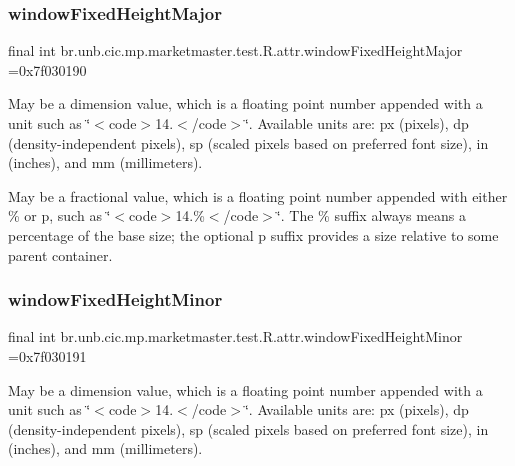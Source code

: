 \subsubsection{\texorpdfstring{window\+Fixed\+Height\+Major}{windowFixedHeightMajor}}
{\footnotesize\ttfamily final int br.\+unb.\+cic.\+mp.\+marketmaster.\+test.\+R.\+attr.\+window\+Fixed\+Height\+Major =0x7f030190\hspace{0.3cm}{\ttfamily [static]}}

May be a dimension value, which is a floating point number appended with a unit such as \char`\"{}$<$code$>$14.\+5sp$<$/code$>$\char`\"{}. Available units are\+: px (pixels), dp (density-\/independent pixels), sp (scaled pixels based on preferred font size), in (inches), and mm (millimeters). 

May be a fractional value, which is a floating point number appended with either \% or p, such as \char`\"{}$<$code$>$14.\%$<$/code$>$\char`\"{}. The \% suffix always means a percentage of the base size; the optional p suffix provides a size relative to some parent container. \mbox{\label{classbr_1_1unb_1_1cic_1_1mp_1_1marketmaster_1_1test_1_1R_1_1attr_a641af7913b6ef58295b94b509cdb4751}} 
\subsubsection{\texorpdfstring{window\+Fixed\+Height\+Minor}{windowFixedHeightMinor}}
{\footnotesize\ttfamily final int br.\+unb.\+cic.\+mp.\+marketmaster.\+test.\+R.\+attr.\+window\+Fixed\+Height\+Minor =0x7f030191\hspace{0.3cm}{\ttfamily [static]}}

May be a dimension value, which is a floating point number appended with a unit such as \char`\"{}$<$code$>$14.\+5sp$<$/code$>$\char`\"{}. Available units are\+: px (pixels), dp (density-\/independent pixels), sp (scaled pixels based on preferred font size), in (inches), and mm (millimeters). 

